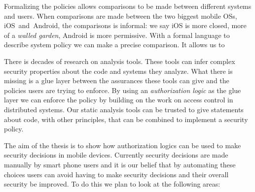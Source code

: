 \documentclass[a4paper,sfsidenotes]{tufte-book}
\begin{document}
Formalizing the policies allows comparisons to be made between different systems
and users.  When comparisons are made between the two biggest mobile OSs,
iOS~and~Android, the comparisons is informal: we say iOS is more closed, more of
a \emph{walled garden}, Android is more permissive.  With a formal language to
describe system policy we can make a precise comparison.  It allows us to 

There is decades of research on analysis tools.  These tools can infer complex
security properties about the code and systems they analyze.  What there is
missing is a glue layer between the assurances these tools can give and the
policies users are trying to enforce.  By using an \emph{authorization logic} as
the glue layer we can enforce the policy by building on the work on access
control in distributed systems.  Our static analysis tools can be trusted to
give statements about code, with other principles, that can be combined to
implement a security policy.

The aim of the thesis is to show how authorization logics can be used to make
security decisions in mobile devices.  Currently security decisions are made
manually by smart phone users and it is our belief that by automating these
choices users can avoid having to make security decisions and their overall
security be improved.  To do this we plan to look at the following areas: 
\end{document}
